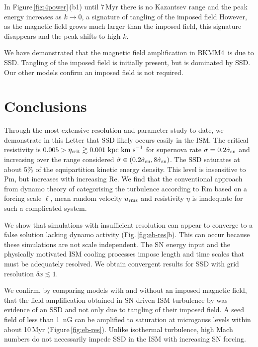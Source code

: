 \documentclass[preprint2]{aastex63}
\newcommand\SNr{\dot\sigma_{\rm sn}}
\newcommand\kpc{~ {\rm kpc}}
\newcommand\dx{ {\delta x}}
\newcommand\kms{~ {\rm km~ s}^{-1}}
\newcommand\BKM{{\sf BKMM4}}
\begin{document}
{ In Figure\,\ref{fig:4power}\,(b1) {until 7\,Myr there is no Kazantsev range
 and the peak energy increases as $k\rightarrow0$, a signature of tangling of
 the imposed field
 However, as the magnetic field grows much larger than the imposed field,
 this signature disappears and the peak shifts to high $k$.}
 
 {We have demonstrated that the magnetic field amplification in \BKM\ is
 due to SSD. 
 Tangling of the imposed field is {initially} present, but is
 dominated by SSD. {O}ur other models 
 confirm an imposed field is not required.
 }

\section{Conclusions}\label{sec:conc}

 {Through the most extensive resolution and parameter study to date, we
   demonstrate in this Letter that SSD
{likely occurs easily}
 in the ISM.
 The critical resistivity is $0.005>\eta_{\rm crit}\gtrsim0.001\kpc\kms$ for 
 supernova rate $\dot \sigma=0.2\SNr$ and increasing over the 
 range considered $\dot \sigma\in(0.2\SNr,8\SNr)$.
 The SSD
 saturates at about 5\% of the equipartition kinetic energy
 density.
 This level is insensitive to Pm, but increases with increasing Re.}
 We find that the conventional approach from dynamo theory of categorising the 
 turbulence according to Rm based on a forcing scale $\ell$, mean random
 velocity $u_{\rm rms}$ and resistivity $\eta$ is inadequate for such a
 complicated system.

 We show that simulations with insufficient resolution can appear to
 converge to a false solution lacking dynamo activity
 (Fig.\,\ref{fig:eb-res}b). This can occur because these simulations are not
 scale independent. 
 The SN energy input and the physically motivated ISM cooling processes impose
 length and time scales that must be adequately resolved.
 {We obtain convergent results for SSD with grid resolution
 $\dx\lesssim1$.}

{We confirm,
  by comparing models with and without an imposed magnetic field,
 that the field amplification obtained in SN-driven ISM turbulence by
 \citet{BKMM04}
 was evidence of an SSD and not only due to tangling of their imposed field.}
 A seed field of less than 1~nG can be amplified to saturation at microgauss
 levels within about 10\,Myr (Figure\,\ref{fig:eb-res}). 
 Unlike isothermal turbulence, high Mach numbers do not necessarily impede SSD
 in the ISM with increasing SN forcing.

}
\end{document}
